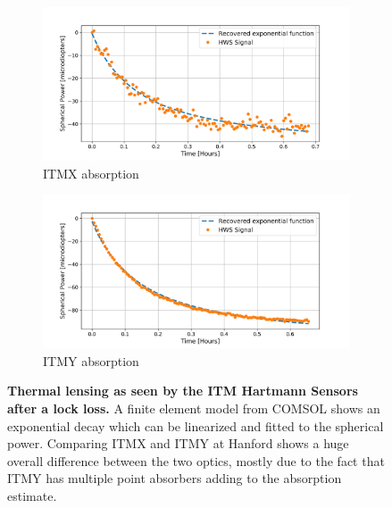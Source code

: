 \begin{figure}[ht]
	\centering
	\begin{subfigure}[a]{0.7\textwidth}
		\centering
		\includegraphics[width=\textwidth]{../Figures/MCMC_ITMX_ABS_FIT.png}
		\caption{ITMX absorption}
		\label{fig:itmx_abs}
	\end{subfigure}
	\hfill
	\begin{subfigure}[b]{0.7\textwidth}
		\centering
		\includegraphics[width=\textwidth]{../Figures/MCMC_ITMY_ABS_FIT.png}
		\caption{ITMY absorption}
		\label{fig:itmy_abs}
	\end{subfigure}
	\caption[Thermal lensing as seen by the ITM Hartmann Sensors after a lock loss.]  
	{\textbf{Thermal lensing as seen by the ITM Hartmann Sensors after a lock loss.} A finite element model from COMSOL shows an exponential decay which can be linearized and fitted to the spherical power. Comparing ITMX and ITMY at Hanford shows a huge overall difference between the two optics, mostly due to the fact that ITMY has multiple point absorbers adding to the absorption estimate.}
	\label{fig:hws_abs}
\end{figure}

